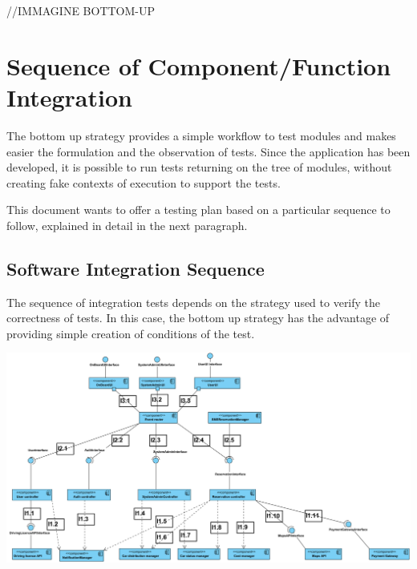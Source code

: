 //IMMAGINE BOTTOM-UP

\section{Sequence of Component/Function Integration}
The bottom up strategy provides a simple workflow to test modules and makes easier the formulation and the observation of tests.
Since the application has been developed, it is possible to run tests returning on the tree of modules, without creating fake contexts of execution to support the tests.

This document wants to offer a testing plan based on a particular sequence to follow, explained in detail in the next paragraph.

\subsection{Software Integration Sequence}
The sequence of integration tests depends on the strategy used to verify the correctness of tests.
In this case, the bottom up strategy has the advantage of providing simple creation of conditions of the test.

\begin{minipage}{\textwidth}
\includegraphics[width=\textwidth, keepaspectratio]{../images/diagram/integration_sequence.png}
\end{minipage}

